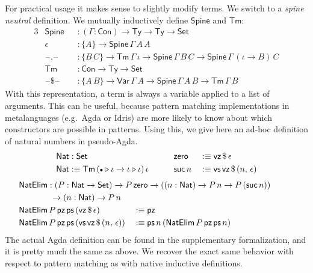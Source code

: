 \documentclass[12pt,a4paper,twoside,openany]{book}
\theoremstyle{remark}
\theoremstyle{definition}
\newcommand{\ms}[1]{\mathsf{#1}}
\newcommand{\Con}{\mathsf{Con}}
\newcommand{\Tm}{\mathsf{Tm}}
\newcommand{\Ty}{\mathsf{Ty}}
\newcommand{\blank}{\mathord{\hspace{1pt}\text{--}\hspace{1pt}}}
\newcommand{\Set}{\mathsf{Set}}
\newcommand{\ext}{\triangleright}
\newcommand{\emptycon}{\scaleobj{.75}\bullet}
\newcommand{\Var}{\ms{Var}}
\newcommand{\vz}{\ms{vz}}
\newcommand{\vs}{\ms{vs}}
\newcommand{\Nat}{\ms{Nat}}
\newcommand{\defn}{:\equiv}
\begin{document}
For practical usage it makes sense to slightly modify terms. We switch to a
\emph{spine neutral} definition. We mutually inductively define $\ms{Spine}$ and
$\Tm$:
\begin{alignat*}{3}
  & \ms{Spine} &&: (\Gamma : \Con) \to \Ty \to \Ty \to \Set \\
  & \epsilon &&: \{A\} \to \ms{Spine}\,\Gamma\,A\,A\\
  & \blank\!,\!\blank &&: \{B\,C\} \to \Tm\,\Gamma\,\iota \to \ms{Spine}\,\Gamma\,B\,C \to \ms{Spine}\,\Gamma\,(\iota\to B)\,C\\
  & \Tm  &&: \Con \to \Ty \to \Set \\
  & \blank\$\blank &&: \{A\,B\} \to \Var\,\Gamma\,A \to \ms{Spine}\,\Gamma\,A\,B \to \Tm\,\Gamma\,B
\end{alignat*}
With this representation, a term is always a variable applied to a list of
arguments. This can be useful, because pattern matching implementations in
metalanguages (e.g.\ Agda or Idris) are more likely to know about which
constructors are possible in patterns. Using this, we give here an ad-hoc
definition of natural numbers in pseudo-Agda.
\begin{alignat*}{3}
  &\Nat : \Set && \ms{zero} &&\defn \vz\,\$\,\epsilon\\
  &\Nat \defn \Tm\,(\emptycon\ext \iota\to \iota \ext \iota)\,\iota\hspace{2em} && \ms{suc}\,n &&\defn \vs\,\vz\,\$\,(n,\,\epsilon)
\end{alignat*}
\begin{alignat*}{3}
  &\hspace{-6.5em}\rlap{$\ms{NatElim} : (P : \Nat \to \Set) \to P\,\ms{zero}\to ((n : \Nat) \to P\,n \to P\,(\ms{suc}\,n))$}\\
  &\hspace{-6.5em}\rlap{$\hspace{4em}\to (n : \Nat) \to P\,n$}\\
  &\hspace{-6.5em}\ms{NatElim}\,P\,\ms{pz}\,\ms{ps}\,(\vz\,\$\,\epsilon) &&\defn \ms{pz}\\
  &\hspace{-6.5em}\ms{NatElim}\,P\,\ms{pz}\,\ms{ps}\,(\vs\,\vz\,\$\,(n,\,\epsilon)) &&\defn
    \ms{ps}\,n\,(\ms{NatElim}\,P\,\ms{pz}\,\ms{ps}\,n)
\end{alignat*}
The actual Agda definition can be found in the supplementary formalization, and
it is pretty much the same as above. We recover the exact same behavior with
respect to pattern matching as with native inductive definitions.
\end{document}
